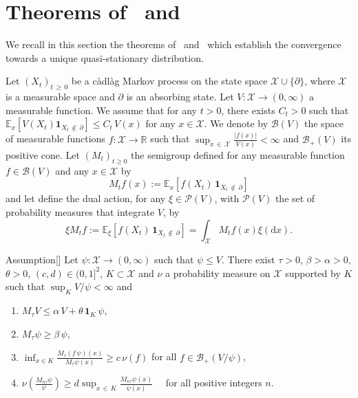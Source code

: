 \documentclass[AHL,Unicode,longabstracts,published]{cedram}
\newcommand{\RR}{\mathbb{R}}
\newcommand{\EE}{\mathbb{E}}
\newcommand{\clX}{\mathcal{X}}
\newcommand{\clB}{\mathcal{B}}
\newcommand{\clP}{\mathcal{P}}
\newcommand{\dif}{\mathrm{d}}
\newcommand{\1}{\mathbf{1}}
\newcommand*{\Aenumi}{\renewcommand*{\theenumi}{A\arabic{enumi}}}
\begin{document}
\section{Theorems of~\cite{BCGM} and~\cite{CV20}}



We recall in this section the theorems of~\cite{BCGM} and~\cite{CV20} which establish the convergence towards a unique quasi-stationary distribution.


Let $(X_t)_{t\,\geq\,0}$ be a càdlàg Markov process on the state space $\clX\cup \{\partial\}$, where $\clX$ is a measurable space and $\partial$ is an absorbing state. Let $V:\clX \to (0,\infty)$ a measurable function. We assume that for any $t>0$, there exists $C_t>0$ such that $\EE_x[V(X_t)\1_{X_t\,\notin\,\partial}]\leq C_t\,V(x)$ for any $x\in \clX$. We denote by $\clB(V)$ the space of measurable functions $f:\clX\to\RR$ such that $\sup_{x\,\in\,\clX} \frac{|f(x)|}{V(x)}<\infty$ and $\clB_+(V)$ its positive cone. Let $(M_t)_{t\geq 0}$ the semigroup defined for any measurable function $f\in \clB(V)$ and any $x\in\clX$ by
\[
M_t f(x) := \EE_x\left[f(X_t)\,\1_{X_t\,\notin\,\partial}\right]
\]
and let define the dual action, for any $\xi\in \clP(V)$, with $\clP(V)$ the set of probability measures that integrate $V$, by
\[
\xi M_t f := \EE_\xi\left[f(X_t)\,\1_{X_t\,\notin\,\partial}\right] = \int_\clX M_tf(x)\xi(\dif x).
\]



\begin{enonce}{Assumption}[{\cite[Assumption~A]{BCGM}}]\label{hyp:BCGM}
Let $\psi:\clX \to (0,\infty)$ such that $\psi\leq V$. There exist $\tau>0$, $\beta>\alpha>0$, $\theta>0$, $(c,d)\in (0,1]^2$, $K\subset \clX$ and $\nu$ a probability measure on $\clX$ supported by $K$ such that $\sup_K V/\psi <\infty$ and
\begin{enumerate}\Aenumi
\item\label{A1} $M_\tau V\leq \alpha\,V + \theta\,\1_K\,\psi$,
\item\label{A2} $M_\tau \psi\geq \beta\,\psi$,
\item\label{A3} $\inf_{x\in K} \frac{M_\tau(f\,\psi)(x)}{M_\tau\psi(x)}\geq c\,\nu(f)$ \quad for all $f\in \clB_+(V/\psi)$,
\item\label{A4} $\nu(\frac{M_{n\tau}\psi}{\psi}) \geq d \sup_{x\,\in\,K} \frac{M_{n\tau}\psi(x)}{\psi(x)} \quad$ for all positive integers $n$.
\end{enumerate}
\end{enonce}
\end{document}
